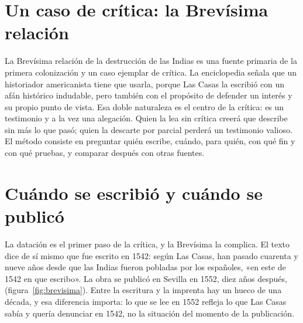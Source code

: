 \documentclass{book}
\begin{document}

\section{Un caso de crítica: la Brevísima relación}

La Brevísima relación de la destrucción de las Indias es una fuente primaria de la primera colonización y un caso ejemplar de crítica. La enciclopedia señala que un historiador americanista tiene que usarla, porque Las Casas la escribió con un afán histórico indudable, pero también con el propósito de defender un interés y su propio punto de vista. Esa doble naturaleza es el centro de la crítica: es un testimonio y a la vez una alegación. Quien la lea sin crítica creerá que describe sin más lo que pasó; quien la descarte por parcial perderá un testimonio valioso. El método consiste en preguntar quién escribe, cuándo, para quién, con qué fin y con qué pruebas, y comparar después con otras fuentes.


\section{Cuándo se escribió y cuándo se publicó}

La datación es el primer paso de la crítica, y la Brevísima la complica. El texto dice de sí mismo que fue escrito en 1542: según Las Casas, han pasado cuarenta y nueve años desde que las Indias fueron pobladas por los españoles, «en este de 1542 en que escribo». La obra se publicó en Sevilla en 1552, diez años después, (figura~\ref{fig:brevisima}). Entre la escritura y la imprenta hay un hueco de una década, y esa diferencia importa: lo que se lee en 1552 refleja lo que Las Casas sabía y quería denunciar en 1542, no la situación del momento de la publicación.

\end{document}
